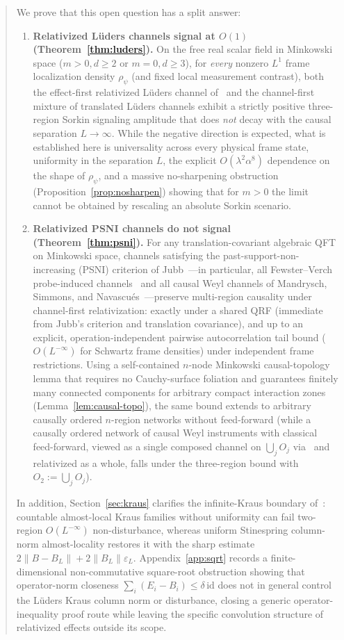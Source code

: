\documentclass[11pt,a4paper]{article}
\theoremstyle{definition}
\theoremstyle{remark}
\newcommand{\id}{\mathrm{id}}
\newcommand{\norm}[1]{\|#1\|}
\begin{document}
\begin{abstract}
We prove that this open question has a split answer:
\begin{enumerate}[label=\textup{(\arabic*)},leftmargin=*,nosep]
\item \textbf{Relativized L\"uders channels signal at $O(1)$ (Theorem~\ref{thm:luders}).} On the free real scalar field in Minkowski space ($m>0, d\ge 2$ or $m=0, d\ge 3$), for \emph{every} nonzero $L^1$ frame localization density $\rho_\psi$ (and fixed local measurement contrast), both the effect-first relativized L\"uders channel of~\cite[Cor.~4.7]{FewsterLoveridge2026} and the channel-first mixture of translated L\"uders channels exhibit a strictly positive three-region Sorkin signaling amplitude that does \emph{not} decay with the causal separation $L\to\infty$. While the negative direction is expected, what is established here is universality across every physical frame state, uniformity in the separation $L$, the explicit $O(\lambda^2\alpha^8)$ dependence on the shape of $\rho_\psi$, and a massive no-sharpening obstruction (Proposition~\ref{prop:nosharpen}) showing that for $m>0$ the limit cannot be obtained by rescaling an absolute Sorkin scenario.
\item \textbf{Relativized PSNI channels do not signal (Theorem~\ref{thm:psni}).} For any translation-covariant algebraic QFT on Minkowski space, channels satisfying the past-support-non-increasing (PSNI) criterion of Jubb~\cite{Jubb2022}---in particular, all Fewster--Verch probe-induced channels~\cite{FewsterVerch2020} and all causal Weyl channels of Mandrysch, Simmons, and Navascu\'es~\cite{Mandrysch2026}---preserve multi-region causality under channel-first relativization: exactly under a shared QRF (immediate from Jubb's criterion and translation covariance), and up to an explicit, operation-independent pairwise autocorrelation tail bound ($O(L^{-\infty})$ for Schwartz frame densities) under independent frame restrictions. Using a self-contained $n$-node Minkowski causal-topology lemma that requires no Cauchy-surface foliation and guarantees finitely many connected components for arbitrary compact interaction zones (Lemma~\ref{lem:causal-topo}), the same bound extends to arbitrary causally ordered $n$-region networks without feed-forward (while a causally ordered network of causal Weyl instruments with classical feed-forward, viewed as a single composed channel on $\bigcup_j O_j$ via~\cite[Thm.~20]{Mandrysch2026} and relativized as a whole, falls under the three-region bound with $O_2 := \bigcup_j O_j$).
\end{enumerate}
In addition, Section~\ref{sec:kraus} clarifies the infinite-Kraus boundary of~\cite[Def.~4.3 and Prop.~4.4(ii)]{FewsterLoveridge2026}: countable almost-local Kraus families without uniformity can fail two-region $O(L^{-\infty})$ non-disturbance, whereas uniform Stinespring column-norm almost-locality restores it with the sharp estimate $2\norm{B-B_L}+2\norm{B_L}\varepsilon_L$. Appendix~\ref{app:sqrt} records a finite-dimensional non-commutative square-root obstruction showing that operator-norm closeness $\sum_i(E_i-B_i)\le\delta\,\id$ does not in general control the L\"uders Kraus column norm or disturbance, closing a generic operator-inequality proof route while leaving the specific convolution structure of relativized effects outside its scope.

\end{abstract}
\end{document}
